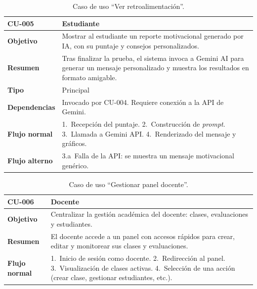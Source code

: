 \begin{table}[H]
\centering
\caption{Caso de uso ``Ver retroalimentación''.}
\label{tab:cu_retro}
\begin{small}
\begin{tabularx}{\textwidth}{|L{3cm}|X|}
\hline
{}
 CU-005 &  Estudiante\\
\hline
\textbf{Objetivo} & Mostrar al estudiante un reporte motivacional generado por IA, con su puntaje y consejos personalizados.\\
\hline
\textbf{Resumen} & Tras finalizar la prueba, el sistema invoca a Gemini AI para generar un mensaje personalizado y muestra los resultados en formato amigable.\\
\hline
\textbf{Tipo} & Principal\\
\hline
\textbf{Dependencias} & Invocado por CU-004. Requiere conexión a la API de Gemini.\\
\hline
\textbf{Flujo normal} & 1.~Recepción del puntaje. 2.~Construcción de \textit{prompt}. 3.~Llamada a Gemini API. 4.~Renderizado del mensaje y gráficos.\\
\hline
\textbf{Flujo alterno} & 3.a~Falla de la API: se muestra un mensaje motivacional genérico.\\
\hline
\end{tabularx}
\end{small}
\fuenteautor
\end{table}

\begin{table}[H]
\centering
\caption{Caso de uso ``Gestionar panel docente''.}
\label{tab:cu_panel}
\begin{small}
\begin{tabularx}{\textwidth}{|L{3cm}|X|}
\hline
{}
 CU-006 &  Docente\\
\hline
\textbf{Objetivo} & Centralizar la gestión académica del docente: clases, evaluaciones y estudiantes.\\
\hline
\textbf{Resumen} & El docente accede a un panel con accesos rápidos para crear, editar y monitorear sus clases y evaluaciones.\\
\hline
\textbf{Flujo normal} & 1.~Inicio de sesión como docente. 2.~Redirección al panel. 3.~Visualización de clases activas. 4.~Selección de una acción (crear clase, gestionar estudiantes, etc.).\\
\hline
\end{tabularx}
\end{small}
\fuenteautor
\end{table}

